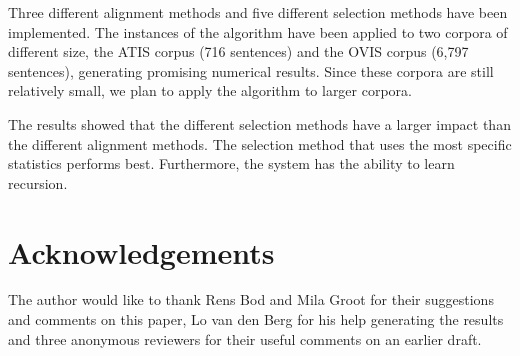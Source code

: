 \documentclass[letterpaper,mlapa]{article}
\begin{document}
Three different alignment methods and five different selection methods have been
implemented. The instances of the algorithm have been applied to two corpora
of different size, the ATIS corpus (716 sentences) and the OVIS corpus (6,797
sentences), generating promising numerical results. Since these corpora are
still relatively small, we plan to apply the algorithm to larger corpora.

The results showed that the different selection methods have a larger impact
than the different alignment methods. The selection method that uses the most
specific statistics performs best. Furthermore, the system has the ability to
learn recursion.


\section*{Acknowledgements}

The author would like to thank Rens Bod and Mila Groot for their suggestions and
comments on this paper, Lo van den Berg for his help generating the results and
three anonymous reviewers for their useful comments on an earlier draft.
\end{document}
